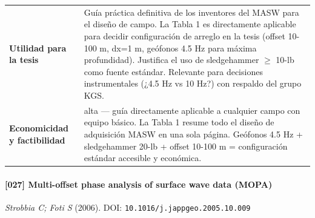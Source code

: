 \begin{center}
\begin{tabularx}{\textwidth}{@{}>{\bfseries}p{3.3cm} X@{}}
Utilidad para la tesis & Guía práctica definitiva de los inventores del MASW para el diseño de campo. La Tabla 1 es directamente aplicable para decidir configuración de arreglo en la tesis (offset 10-100 m, dx=1 m, geófonos 4.5 Hz para máxima profundidad). Justifica el uso de sledgehammer $\geq$ 10-lb como fuente estándar. Relevante para decisiones instrumentales (¿4.5 Hz vs 10 Hz?) con respaldo del grupo KGS. \\
Economicidad y factibilidad & alta --- guía directamente aplicable a cualquier campo con equipo básico. La Tabla 1 resume todo el diseño de adquisición MASW en una sola página. Geófonos 4.5 Hz + sledgehammer 20-lb + offset 10-100 m = configuración estándar accesible y económica. \\
\bottomrule
\end{tabularx}
\end{center}

\paragraph{[027] Multi-offset phase analysis of surface wave data (MOPA)} \emph{Strobbia C; Foti S} (2006).
{\scriptsize DOI: \texttt{10.1016/j.jappgeo.2005.10.009}}

